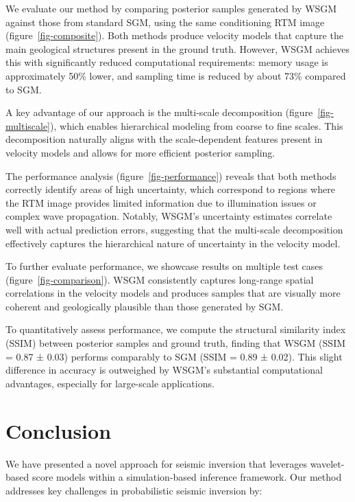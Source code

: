 \documentclass{IMAGE2025}
\begin{document}
We evaluate our method by comparing posterior samples generated by WSGM
against those from standard SGM, using the same conditioning RTM image
(figure~\ref{fig-composite}). Both methods produce velocity models that
capture the main geological structures present in the ground truth.
However, WSGM achieves this with significantly reduced computational
requirements: memory usage is approximately 50\% lower, and sampling
time is reduced by about 73\% compared to SGM.

A key advantage of our approach is the multi-scale decomposition
(figure~\ref{fig-multiscale}), which enables hierarchical modeling from
coarse to fine scales. This decomposition naturally aligns with the
scale-dependent features present in velocity models and allows for more
efficient posterior sampling.

The performance analysis (figure~\ref{fig-performance}) reveals that
both methods correctly identify areas of high uncertainty, which
correspond to regions where the RTM image provides limited information
due to illumination issues or complex wave propagation. Notably, WSGM's
uncertainty estimates correlate well with actual prediction errors,
suggesting that the multi-scale decomposition effectively captures the
hierarchical nature of uncertainty in the velocity model.

To further evaluate performance, we showcase results on multiple test
cases (figure~\ref{fig-comparison}). WSGM consistently captures
long-range spatial correlations in the velocity models and produces
samples that are visually more coherent and geologically plausible than
those generated by SGM.

To quantitatively assess performance, we compute the structural
similarity index (SSIM) between posterior samples and ground truth,
finding that WSGM (SSIM = 0.87 ± 0.03) performs comparably to SGM (SSIM
= 0.89 ± 0.02). This slight difference in accuracy is outweighed by
WSGM's substantial computational advantages, especially for large-scale
applications.

\section{Conclusion}\label{conclusion}

We have presented a novel approach for seismic inversion that leverages
wavelet-based score models within a simulation-based inference
framework. Our method addresses key challenges in probabilistic seismic
inversion by:
\end{document}

